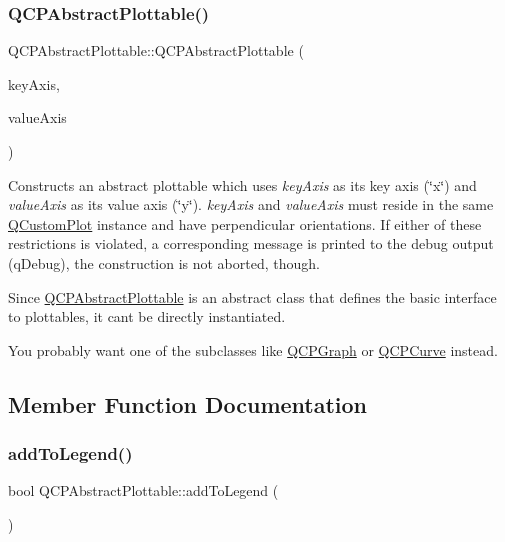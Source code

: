 \subsubsection{\texorpdfstring{Q\+C\+P\+Abstract\+Plottable()}{QCPAbstractPlottable()}}
{\footnotesize\ttfamily Q\+C\+P\+Abstract\+Plottable\+::\+Q\+C\+P\+Abstract\+Plottable (\begin{DoxyParamCaption}\item[{\hyperlink{class_q_c_p_axis}{Q\+C\+P\+Axis} $\ast$}]{key\+Axis,  }\item[{\hyperlink{class_q_c_p_axis}{Q\+C\+P\+Axis} $\ast$}]{value\+Axis }\end{DoxyParamCaption})}

Constructs an abstract plottable which uses {\itshape key\+Axis} as its key axis (\char`\"{}x\char`\"{}) and {\itshape value\+Axis} as its value axis (\char`\"{}y\char`\"{}). {\itshape key\+Axis} and {\itshape value\+Axis} must reside in the same \hyperlink{class_q_custom_plot}{Q\+Custom\+Plot} instance and have perpendicular orientations. If either of these restrictions is violated, a corresponding message is printed to the debug output (q\+Debug), the construction is not aborted, though.

Since \hyperlink{class_q_c_p_abstract_plottable}{Q\+C\+P\+Abstract\+Plottable} is an abstract class that defines the basic interface to plottables, it can\textquotesingle{}t be directly instantiated.

You probably want one of the subclasses like \hyperlink{class_q_c_p_graph}{Q\+C\+P\+Graph} or \hyperlink{class_q_c_p_curve}{Q\+C\+P\+Curve} instead. 

\subsection{Member Function Documentation}
\hypertarget{class_q_c_p_abstract_plottable_a70f8cabfd808f7d5204b9f18c45c13f5}{}\label{class_q_c_p_abstract_plottable_a70f8cabfd808f7d5204b9f18c45c13f5} 
\subsubsection{\texorpdfstring{add\+To\+Legend()}{addToLegend()}}
{\footnotesize\ttfamily bool Q\+C\+P\+Abstract\+Plottable\+::add\+To\+Legend (\begin{DoxyParamCaption}{ }\end{DoxyParamCaption})\hspace{0.3cm}{\ttfamily [virtual]}}

